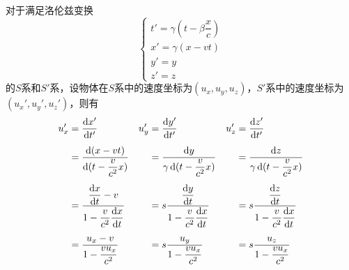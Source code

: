 \begin{prove}
    对于满足洛伦兹变换
    \[\left\{\begin{array}{l}
            t'=\gamma(t-\beta\dfrac{x}{c}) \\
            x'=\gamma(x-vt)                \\
            y'=y                           \\
            z'=z
        \end{array}\right.\]
    的$S$系和$S'$系，设物体在$S$系中的速度坐标为$(u_x,u_y,u_z)$，$S'$系中的速度坐标为$(u_x',u_y',u_z')$，则有
    \[\begin{aligned}
            u_x' & =\dfrac{\dif x'}{\dif t'}                                                 & u_y' & =\dfrac{\dif y'}{\dif t'}                                                & u_z' & =\dfrac{\dif z'}{\dif t'}                                                \\[1ex]
                 & =\dfrac{\dif(x-vt)}{\dif(t-\dfrac{v}{c^2}x)}                              &      & =\dfrac{\dif y}{\gamma\dif(t-\dfrac{v}{c^2}x)}                           &      & =\dfrac{\dif z}{\gamma\dif(t-\dfrac{v}{c^2}x)}                           \\[1ex]
                 & =\dfrac{\dfrac{\dif x}{\dif t}-v}{1-\dfrac{v}{c^2}\dfrac{\dif x}{\dif t}} &      & =s\dfrac{\dfrac{\dif y}{\dif t}}{1-\dfrac{v}{c^2}\dfrac{\dif x}{\dif t}} &      & =s\dfrac{\dfrac{\dif z}{\dif t}}{1-\dfrac{v}{c^2}\dfrac{\dif x}{\dif t}} \\[1ex]
                 & =\dfrac{u_x-v}{1-\dfrac{vu_x}{c^2}}                                       &      & =s\dfrac{u_y}{1-\dfrac{vu_x}{c^2}}                                       &      & =s\dfrac{u_z}{1-\dfrac{vu_x}{c^2}}
        \end{aligned}\]

\end{prove}
